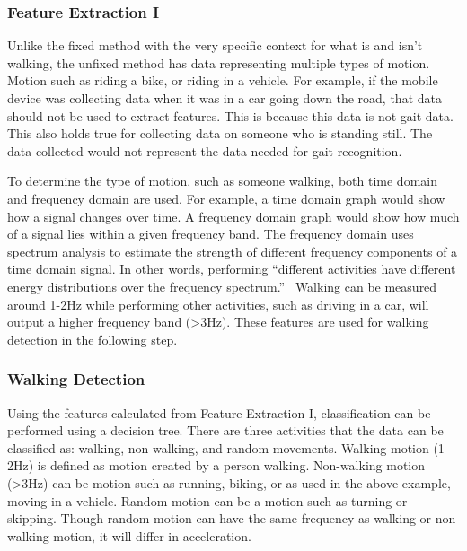\documentclass{sig-alternate}
\begin{document}
\subsubsection{Feature Extraction I}
	 Unlike the fixed method with the very specific context for what is and isn't walking, the unfixed method has data representing multiple types of motion. Motion such as riding a bike, or riding in a vehicle. For example, if the mobile device was collecting data when it was in a car going down the road, that data should not be used to extract features. This is because this data is not gait data. This also holds true for collecting data on someone who is standing still. The data collected would not represent the data needed for gait recognition.
	 
 	
	To determine the type of motion, such as someone walking, both time domain and frequency domain are used. For example, a time domain graph would show how a signal changes over time. A frequency domain graph would show how much of a signal lies within a given frequency band. The frequency domain uses spectrum analysis to estimate the strength of different frequency components of a time domain signal. In other words, performing ``different activities have different energy distributions over the frequency spectrum.''~\cite{Lu:2014} Walking can be measured around 1-2Hz while performing other activities, such as driving in a car, will output a higher frequency band (>3Hz). These features are used for walking detection in the following step.
			
\subsubsection{Walking Detection} \label{WD}
	Using the features calculated from Feature Extraction I, classification can be performed using a decision tree. There are three activities that the data can be classified as: walking, non-walking, and random movements. Walking motion (1-2Hz) is defined as motion created by a person walking. Non-walking motion (>3Hz) can be motion such as running, biking, or as used in the above example, moving in a vehicle. Random motion can be a motion such as turning or skipping. Though random motion can have the same frequency as walking or non-walking motion, it will differ in acceleration.  
			
\end{document}
